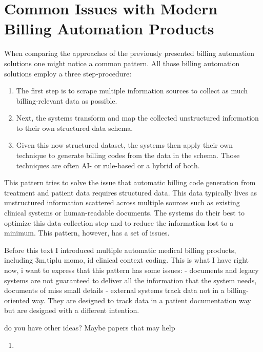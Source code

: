 \section{Common Issues with Modern Billing Automation Products}\label{sec:common-issues-with-modern-billing-automation-products}
When comparing the approaches of the previously presented billing automation solutions one might notice a common pattern.
All those billing automation solutions employ a three step-procedure:
\begin{enumerate}
    \item The first step is to scrape multiple information sources to collect as much billing-relevant data as possible.
    \item Next, the systems transform and map the collected unstructured information to their own structured data schema.
    \item Given this now structured dataset, the systems then apply their own technique to generate billing codes from the data in the schema.
    Those techniques are often AI- or rule-based or a hybrid of both.
\end{enumerate}

This pattern tries to solve the issue that automatic billing code generation from treatment and patient data requires structured data.
This data typically lives as unstructured information scattered across multiple sources such as existing clinical systems or human-readable documents.
The systems do their best to optimize this data collection step and to reduce the information lost to a minimum.
This pattern, however, has a set of issues.


Before this text I introduced multiple automatic medical billing products, including 3m,tiplu momo, id clinical context coding.
This is what I have right now, i want to express that this pattern has some issues:
- documents and legacy systems are not guaranteed to deliver all the information that the system needs, documents of miss small details
- external systems track data not in a billing-oriented way. They are designed to track data in a patient documentation way but are designed with a different intention.

do you have other ideas? Maybe papers that may help


\begin{enumerate}
    \item
\end{enumerate}

